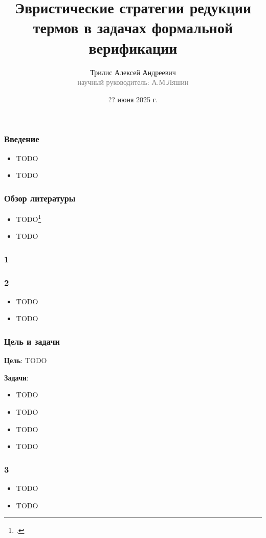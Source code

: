 \documentclass{beamer}
\begin{document}
\title[Стратегии редукции термов в верификации]{Эвристические стратегии редукции термов в задачах формальной верификации}
\author[Трилис А.А.]{Трилис Алексей Андреевич\\{\footnotesize\textcolor{gray}{научный руководитель: А.М.Ляшин}}}
\date{?? июня 2025 г.}
\frame{\titlepage}

\begin{frame}\frametitle{Введение}
\begin{itemize}
  \item TODO
  \item TODO
\end{itemize}
\end{frame}

\lstset{language=haskell}
\begin{frame}\frametitle{Обзор литературы}
\begin{itemize}
  \item TODO\footcite{example}
  \item TODO
\end{itemize}
\end{frame}

\begin{frame}\frametitle{1}
\end{frame}

\begin{frame}\frametitle{2}
\begin{itemize}
  \item TODO
  \item TODO
\end{itemize}
\end{frame}

\begin{frame}\frametitle{Цель и задачи}
\textbf{Цель}: TODO

\textbf{Задачи}:
\begin{itemize}
  \item TODO
  \item TODO
  \item TODO
  \item TODO
\end{itemize}
\end{frame}

\begin{frame}\frametitle{3}
\begin{itemize}
  \item TODO
  \item TODO
\end{itemize}
\end{frame}
\end{document}
